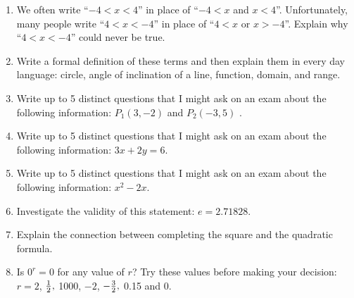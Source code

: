 \begin{enumerate}
\item We often write ``$-4 < x < 4$'' in place of ``$-4 < x$ and $x < 4$''.  Unfortunately, many people write ``$4 < x < -4$'' in place of ``$4 < x$ or $x > -4$''.  Explain why  ``$4 < x < -4$'' could never be true.  \cite{SM}



\item Write a formal definition of these terms and then explain them in every day language:  circle, angle of inclination of a line, function, domain, and range.

\item Write up to 5 distinct questions that I might ask on an exam about the following information:    $
P_1 \left( {3, - 2} \right)
$ and $P_2 \left( { - 3,5} \right)$
.


\item Write up to 5 distinct questions that I might ask on an exam about the following information:  $3x + 2y = 6$.

\item Write up to 5 distinct questions that I might ask on an exam about the following information:  $x^2 - 2x$.

\item Investigate the validity of this statement:  $e = 2.71828.$

\item Explain the connection between completing the square and the quadratic formula.  

\item Is $0^r = 0$ for any value of $r$?  Try these values before making your decision:  $r = 2$, ${\textstyle{1 \over 2}},$ 1000, $-2$, $ - {\textstyle{3 \over 2}},$ 0.15 and 0.

\end{enumerate}

